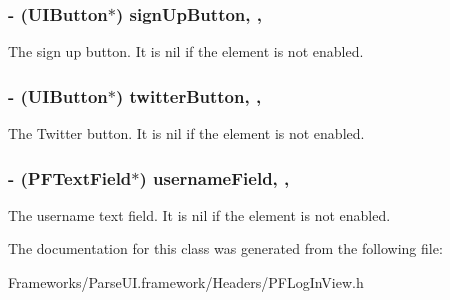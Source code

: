 \subsubsection[{sign\+Up\+Button}]{\setlength{\rightskip}{0pt plus 5cm}-\/ (U\+I\+Button$\ast$) sign\+Up\+Button\hspace{0.3cm}{\ttfamily [read]}, {\ttfamily [nonatomic]}, {\ttfamily [strong]}}\label{interface_p_f_log_in_view_aca49da3d4d6b0e7aa6264953dc74f47a}
The sign up button. It is {\ttfamily nil} if the element is not enabled. \hypertarget{interface_p_f_log_in_view_a831da16d37f7dc63b2d37d198eaafba0}{}
\subsubsection[{twitter\+Button}]{\setlength{\rightskip}{0pt plus 5cm}-\/ (U\+I\+Button$\ast$) twitter\+Button\hspace{0.3cm}{\ttfamily [read]}, {\ttfamily [nonatomic]}, {\ttfamily [strong]}}\label{interface_p_f_log_in_view_a831da16d37f7dc63b2d37d198eaafba0}
The Twitter button. It is {\ttfamily nil} if the element is not enabled. \hypertarget{interface_p_f_log_in_view_af6c5b3c59071b1c79442f4781f703ad2}{}
\subsubsection[{username\+Field}]{\setlength{\rightskip}{0pt plus 5cm}-\/ ({\bf P\+F\+Text\+Field}$\ast$) username\+Field\hspace{0.3cm}{\ttfamily [read]}, {\ttfamily [nonatomic]}, {\ttfamily [strong]}}\label{interface_p_f_log_in_view_af6c5b3c59071b1c79442f4781f703ad2}
The username text field. It is {\ttfamily nil} if the element is not enabled. 

The documentation for this class was generated from the following file\+:\begin{DoxyCompactItemize}
\item 
Frameworks/\+Parse\+U\+I.\+framework/\+Headers/P\+F\+Log\+In\+View.\+h\end{DoxyCompactItemize}
